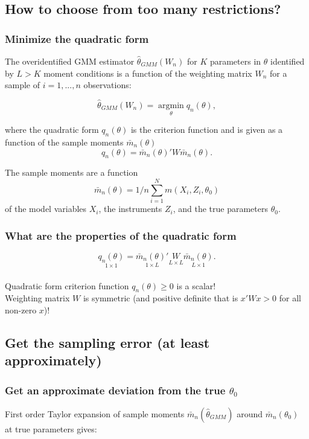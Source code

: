 \documentclass[a4paper,12pt]{article}
\begin{document}
\subsection{How to choose from too many restrictions?}


\subsubsection*{Minimize the quadratic form}

The overidentified GMM estimator $\hat{\theta}_{GMM}(W_n)$ for $K$ parameters in $\theta$ identified by $L>K$ moment conditions is a function of the weighting matrix $W_n$ for a sample of $i=1,...,n$ observations:

$$\hat{\theta}_{GMM}(W_n)=\underset{\theta}{\operatorname{argmin}} q_n(\theta),$$

where the quadratic form $q_n(\theta)$ is the criterion function and is given as a function of the sample moments $\bar{m}_n(\theta)$
$$q_n(\theta)=\bar{m}_n(\theta)'W\bar{m}_n(\theta).$$

The sample moments are a function
$$\bar{m}_n(\theta)=1/n\sum_{i=1}^{N}m(X_i,Z_i,\theta_0)$$
of the model variables $X_i$, the instruments $Z_i$, and the true parameters $\theta_0$.


\subsubsection*{What are the properties of the quadratic form}

$$\underset{\scriptscriptstyle 1\times1}{q_n(\theta)}=\underset{\scriptscriptstyle 1\times L}{\bar{m}_n(\theta)'}\underset{\scriptscriptstyle L\times L}{W}\underset{\scriptscriptstyle L\times1}{\bar{m}_n(\theta)}.$$\\[2ex]

Quadratic form criterion function
$q_n(\theta)\geq0$ is a scalar!\\[2ex]

Weighting matrix $W$ is symmetric (and positive definite that is $x'Wx>0$ for all non-zero $x$)!





\subsection{Get the sampling error (at least approximately)}



\subsubsection*{ Get an approximate deviation from the true $\theta_0$}
First order Taylor expansion of sample moments $\bar{m}_n(\hat{\theta}_{GMM})$ around $\bar{m}_n(\theta_0)$ at true parameters gives:
\end{document}
